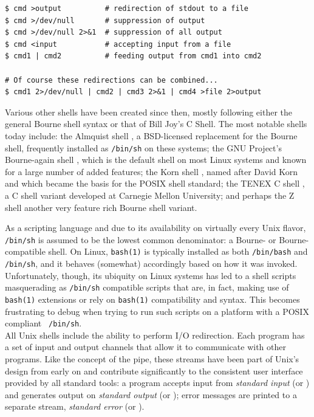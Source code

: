 \begin{lstlisting}[float,label=code:io-redir,caption=Simple I/O redirection in the shell]
$ cmd >output          # redirection of stdout to a file
$ cmd >/dev/null       # suppression of output
$ cmd >/dev/null 2>&1  # suppression of all output
$ cmd <input           # accepting input from a file
$ cmd1 | cmd2          # feeding output from cmd1 into cmd2

# Of course these redirections can be combined...
$ cmd1 2>/dev/null | cmd2 | cmd3 2>&1 | cmd4 >file 2>output
\end{lstlisting}


Various other shells have been created since then,
mostly following either the general Bourne shell
syntax or that of Bill Joy's C
 Shell.  The most notable shells
today include: the Almquist shell , a
BSD-licensed replacement for the Bourne shell,
frequently installed as {\tt /bin/sh} on these
systems; the GNU Project's Bourne-again
shell ,
which is the default shell on most Linux systems and
known for a large number of added features; the Korn
shell , named after David
Korn and which became the
basis for the POSIX shell standard; the TENEX C
shell , a C shell variant developed
at Carnegie Mellon University; and perhaps the Z shell 
another very feature rich Bourne shell variant.

As a scripting language and due to its availability on
virtually every Unix flavor, {\tt /bin/sh} is assumed
to be the lowest common denominator: a Bourne- or
Bourne-compatible shell.  On Linux, {\tt bash(1)} is
typically installed as both {\tt /bin/bash} and {\tt
/bin/sh}, and it behaves (somewhat) accordingly based
on how it was invoked.  Unfortunately, though, its
ubiquity on Linux systems has led to a shell scripts
masquerading as {\tt /bin/sh} compatible scripts that
are, in fact, making use of {\tt bash(1)} extensions
or rely on {\tt bash(1)} compatibility and syntax.
This becomes frustrating to debug when trying to run
such scripts on a platform with a POSIX compliant {\tt
/bin/sh}.  \\

All Unix shells include the ability to perform  I/O
redirection.  Each program has
a set of input and output channels that allow it to
communicate with other programs.  Like the concept of
the pipe, these streams have been part of Unix's
design from early on and contribute significantly to
the consistent user interface provided by all standard
tools:  a program accepts input from {\em standard
input} (or ) and generates output on
{\em standard output} (or ); error
messages are printed to a separate stream, {\em
standard error} (or ).

